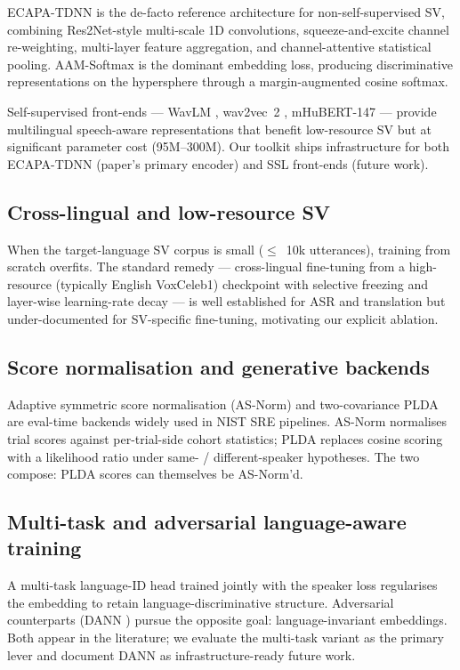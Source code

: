\documentclass[11pt,a4paper]{article}
\begin{document}
ECAPA-TDNN \cite{desplanques2020ecapa} is the de-facto reference
architecture for non-self-supervised SV, combining Res2Net-style
multi-scale 1D convolutions, squeeze-and-excite channel re-weighting,
multi-layer feature aggregation, and channel-attentive statistical
pooling. AAM-Softmax \cite{deng2019arcface} is the dominant
embedding loss, producing discriminative representations on the
hypersphere through a margin-augmented cosine softmax.

Self-supervised front-ends --- WavLM \cite{chen2022wavlm}, wav2vec~2
\cite{baevski2020wav2vec2}, mHuBERT-147 \cite{pratap2024mms} ---
provide multilingual speech-aware representations that benefit
low-resource SV but at significant parameter cost (95M--300M).
Our toolkit ships infrastructure for both ECAPA-TDNN (paper's primary
encoder) and SSL front-ends (future work).

\subsection{Cross-lingual and low-resource SV}

When the target-language SV corpus is small ($\leq$~10k utterances),
training from scratch overfits. The standard remedy --- cross-lingual
fine-tuning from a high-resource (typically English VoxCeleb1)
checkpoint with selective freezing and layer-wise learning-rate
decay --- is well established for ASR and translation but
under-documented for SV-specific fine-tuning, motivating our explicit
ablation.

\subsection{Score normalisation and generative backends}

Adaptive symmetric score normalisation (AS-Norm)
\cite{matejka2017analysis} and two-covariance PLDA
\cite{sizov2014unifying,kenny2010} are eval-time backends widely used
in NIST SRE pipelines. AS-Norm normalises trial scores against
per-trial-side cohort statistics; PLDA replaces cosine scoring with a
likelihood ratio under same- / different-speaker hypotheses. The two
compose: PLDA scores can themselves be AS-Norm'd.

\subsection{Multi-task and adversarial language-aware training}

A multi-task language-ID head trained jointly with the speaker loss
regularises the embedding to retain language-discriminative
structure. Adversarial counterparts (DANN \cite{ganin2015dann}) pursue
the opposite goal: language-invariant embeddings. Both appear in the
literature; we evaluate the multi-task variant as the primary lever
and document DANN as infrastructure-ready future work.
\end{document}
